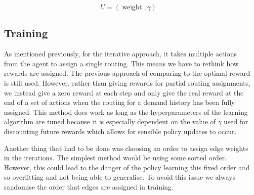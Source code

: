 \begin{equation}
  \label{equation:global_outputs}
  U = (\operatorname{weight}, \gamma)
\end{equation}

\subsection{Training}
As mentioned previously, for the iterative approach, it takes multiple actions from the agent to assign a single routing. This means we have to rethink how rewards are assigned. The previous approach of comparing to the optimal reward is still used. However, rather than giving rewards for partial routing assignments, we instead give a zero reward at each step and only give the real reward at the end of a set of actions when the routing for a demand history has been fully assigned. This method does work as long as the hyperparameters of the learning algorithm are tuned because it is especially dependent on the value of $\gamma$ used for discounting future rewards which allows for sensible policy updates to occur.

Another thing that had to be done was choosing an order to assign edge weights in the iterations. The simplest method would be using some sorted order. However, this could lead to the danger of the policy learning this fixed order and so overfitting and not being able to generalise. To avoid this issue we always randomise the order that edges are assigned in training.

